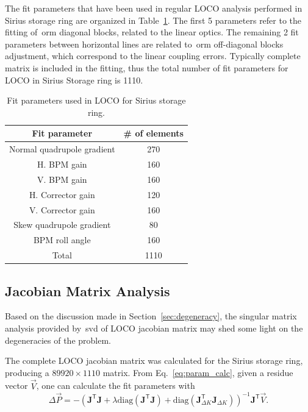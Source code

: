 The fit parameters that have been used in regular LOCO analysis performed in Sirius storage ring are organized in Table~\ref{tab:fit_params}. The first 5 parameters refer to the fitting of~\gls{orm} diagonal blocks, related to the linear optics. The remaining 2 fit parameters between horizontal lines are related to~\gls{orm} off-diagonal blocks adjustment, which correspond to the linear coupling errors. Typically complete matrix is included in the fitting, thus the total number of fit parameters for LOCO in Sirius Storage ring is 1110.
\begin{table}
    \centering
    \caption{Fit parameters used in LOCO for Sirius storage ring.}
    \label{tab:fit_params}
    \begin{tabular}{cc}
        \toprule\toprule
        Fit parameter & \# of elements \\
        \hline
        Normal quadrupole gradient & 270 \\
        H. BPM gain & 160 \\
        V. BPM gain & 160 \\
        H. Corrector gain & 120 \\
        V. Corrector gain & 160 \\
        \hline
        Skew quadrupole gradient & 80 \\
        BPM roll angle & 160 \\ 
        \hline
        Total & 1110 \\
        \bottomrule\bottomrule
    \end{tabular}
\end{table}

\subsection{Jacobian Matrix Analysis}\label{subsec:jacobian_analysis}
Based on the discussion made in Section~\ref{sec:degeneracy}, the singular matrix analysis provided by~\gls{svd} of LOCO jacobian matrix may shed some light on the degeneracies of the problem.

The complete LOCO jacobian matrix was calculated for the Sirius storage ring, producing a $89920 \times 1110$ matrix. From Eq.~\eqref{eq:param_calc}, given a residue vector $\vec{V}$, one can calculate the fit parameters with
\begin{equation*}
\Delta \vec{P} = - \left(\mathbf{J}^{\mathsf{T}}\mathbf{J} + \lambda \mathrm{diag}\left(\mathbf{J}^{\mathsf{T}}\mathbf{J}\right) + \mathrm{diag}\left(\mathbf{J}^{\mathsf{T}}_{\Delta K}\mathbf{J}_{\Delta K}\right) \right)^{-1}\mathbf{J}^{\mathsf{T}}\vec{V}.
\end{equation*}

